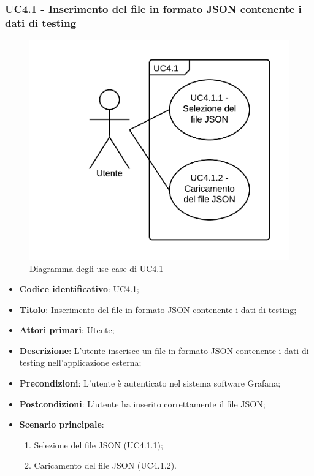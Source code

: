 \subsubsection{UC4.1 - Inserimento del file in formato JSON contenente i dati di testing}
\begin{figure}[H]
\includegraphics{img/UC4.1_-_Inserimento_del_file_in_formato_JSON_contenente_i_dati_di_testing.png}
\caption{Diagramma degli use case di UC4.1}
\end{figure}
\begin{itemize}
    \item \textbf{Codice identificativo}: UC4.1;
    \item \textbf{Titolo}: Inserimento del file in formato JSON contenente i dati di testing;
    \item \textbf{Attori primari}: Utente;
    \item \textbf{Descrizione}: L'utente inserisce un file in formato JSON contenente i dati di testing nell'applicazione esterna;
    \item \textbf{Precondizioni}: L'utente è autenticato nel sistema software Grafana\glo;
    \item \textbf{Postcondizioni}: L'utente ha inserito correttamente il file JSON;
    \item \textbf{Scenario principale}:
		\begin{enumerate}
			\item Selezione del file JSON (UC4.1.1);
			\item Caricamento del file JSON (UC4.1.2).
		\end{enumerate}
\end{itemize}

